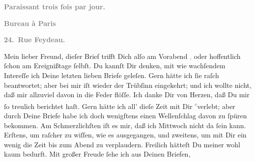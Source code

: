 \begin{ledgroupsized}[t]{13cm}
           \pstart
           \begin{otherlanguage}{french}\textcolor{gray}{\textbf{\textbf{Paraissant trois fois par jour.}}}\end{otherlanguage}\pend
           \pstart
           \begin{otherlanguage}{french}\textcolor{gray}{\textbf{\textbf{Bureau à Paris}}}\end{otherlanguage}\pend
           \pstart
           \begin{otherlanguage}{french}\textcolor{gray}{\textbf{\textbf{24. Rue Feydeau.}}}\end{otherlanguage}\pend
           \pstart\center{}Mein lieber Freund,\pend\pstart
           dieſer Brief trifft Dich alſo am Vorabend{ }\label{K_L02750-1v}\label{K_L02750-1h}\textcolor{gray}{,} oder hoffentlich ſchon am Ereignißtage ſelbſt. Du kannſt Dir denken, mit wie wachſendem Intereſſe
               ich Deine letzten lieben Briefe geleſen. Gern hätte ich ſie raſch beantwortet; aber
               bei mir iſt wieder der Trübſinn eingekehrt; und ich wollte nicht, daß mir allzuviel
               davon in die Feder flöſſe. Ich danke Dir \strikeout{\textcolor{gray}{v}} von Herzen, daß Du mir ſo treulich berichtet haſt.
               Gern  hätte ich all’ dieſe Zeit {\pb}mit Dir \substVorne{}\textsuperscript{\textcolor{gray}{e}}\substDazwischen{}v\substHinten{}erlebt; aber durch Deine Briefe habe ich doch wenigſtens einen Wellenſchlag
               davon zu ſpüren bekommen. Am \strikeout{\textcolor{gray}{S}\textcolor{gray}{×}\-\textcolor{gray}{×}\-\textcolor{gray}{×}\-\textcolor{gray}{×}\-\textcolor{gray}{×}\textcolor{gray}{ſten}} Schmerzlichſten iſt es mir, daß ich Mittwoch
               nicht da ſein kann. Erſtens, um raſcher zu wiſſen, wie es ausgegangen, und zweitens,
               um  mit Dir ein wenig die Zeit bis zum Abend zu verplaudern. Freilich
               hätteſt Du meiner wohl kaum bedurft. Mit großer Freude ſehe ich aus Deinen Briefen,

\end{ledgroupsized}
